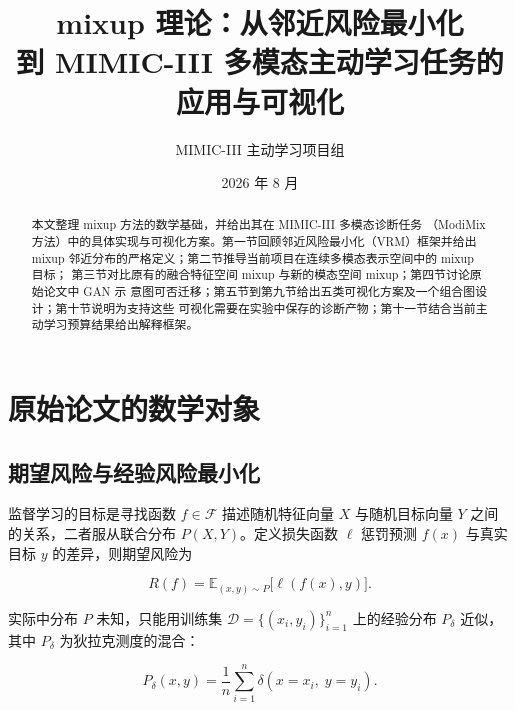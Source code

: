 \documentclass[11pt,a4paper]{article}
\title{%
  mixup 理论：从邻近风险最小化\\[0.4em]
  \large 到 MIMIC-III 多模态主动学习任务的应用与可视化
}
\author{MIMIC-III 主动学习项目组}
\date{2026 年 8 月}
\theoremstyle{definition}
\begin{document}

\maketitle

\begin{abstract}
本文整理 mixup 方法\cite{zhang2018mixup}的数学基础，并给出其在 MIMIC-III 多模态诊断任务
（ModiMix 方法）中的具体实现与可视化方案。第一节回顾邻近风险最小化（VRM）框架并给出
mixup 邻近分布的严格定义；第二节推导当前项目在连续多模态表示空间中的 mixup 目标；
第三节对比原有的融合特征空间 mixup 与新的模态空间 mixup；第四节讨论原始论文中 GAN 示
意图可否迁移；第五节到第九节给出五类可视化方案及一个组合图设计；第十节说明为支持这些
可视化需要在实验中保存的诊断产物；第十一节结合当前主动学习预算结果给出解释框架。
\end{abstract}

\tableofcontents
\newpage

\section{原始论文的数学对象}
\label{sec:original}

\subsection{期望风险与经验风险最小化}

监督学习的目标是寻找函数 $f\in\mathcal{F}$ 描述随机特征向量 $X$ 与随机目标向量 $Y$ 之间
的关系，二者服从联合分布 $P(X,Y)$。定义损失函数 $\ell$ 惩罚预测 $f(x)$ 与真实目标 $y$
的差异，则期望风险为

\begin{equation}
  R(f)=\mathbb{E}_{(x,y)\sim P}\bigl[\ell(f(x),y)\bigr].
  \label{eq:expected-risk}
\end{equation}

实际中分布 $P$ 未知，只能用训练集 $\mathcal{D}=\{(x_i,y_i)\}_{i=1}^{n}$ 上的经验分布
$P_\delta$ 近似，其中 $P_\delta$ 为狄拉克测度的混合：

\begin{equation}
  P_\delta(x,y)=\frac{1}{n}\sum_{i=1}^{n}\delta(x=x_i,\;y=y_i).
  \label{eq:empirical-dist}
\end{equation}
\end{document}
